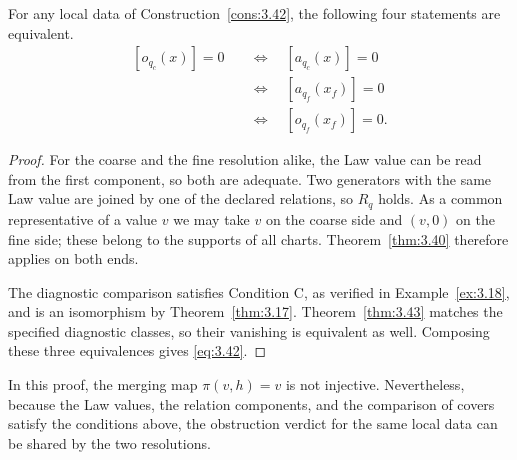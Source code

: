 \begin{theorem}\label{thm:3.44}

For any local data of Construction~\ref{cons:3.42}, the following four statements
are equivalent.
\begin{equation*}
\begin{aligned}
[o_{q_c}(x)]=0
&\quad\Longleftrightarrow\quad[a_{q_c}(x)]=0\\
&\quad\Longleftrightarrow\quad[a_{q_f}(x_f)]=0\\
&\quad\Longleftrightarrow\quad[o_{q_f}(x_f)]=0.
\end{aligned}
\tag{3.42}\label{eq:3.42}
\end{equation*}

\end{theorem}

\begin{proof}

For the coarse and the fine resolution alike, the Law value can be read from the
first component, so both are adequate.
Two generators with the same Law value are joined by one of the declared relations,
so $R_q$ holds.
As a common representative of a value $v$ we may take $v$ on the coarse side and
$(v,0)$ on the fine side; these belong to the supports of all charts.
Theorem~\ref{thm:3.40} therefore applies on both ends.

The diagnostic comparison satisfies Condition C, as verified in
Example~\ref{ex:3.18}, and is an isomorphism by Theorem~\ref{thm:3.17}.
Theorem~\ref{thm:3.43} matches the specified diagnostic classes, so their vanishing
is equivalent as well.
Composing these three equivalences gives \eqref{eq:3.42}.

\end{proof}

In this proof, the merging map $\pi(v,h)=v$ is not injective.
Nevertheless, because the Law values, the relation components, and the comparison of
covers satisfy the conditions above, the obstruction verdict for the same local data
can be shared by the two resolutions.

